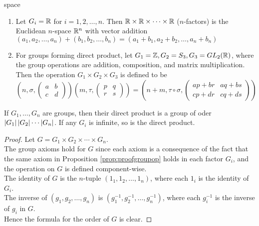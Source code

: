 \begin{example}{\color{white}space}
\begin{enumerate}[label=(\roman*)]
\setlength{\itemsep}{0pt}
\item Let $G_i = \mathbb{R}$ for $i = 1,2,\ldots,n$. Then $\mathbb{R} \times \mathbb{R} \times \cdots \times \mathbb{R}$ ($n$-factors) is the Euclidean $n$-space $\mathbb{R}^n$ with vector addition $(a_1, a_2, \ldots, a_n) + (b_1, b_2, \ldots, b_n) = (a_1 + b_1, a_2 + b_2, \ldots, a_n + b_n)$
\item For groups forming direct product, let $G_1 = \mathbb{Z}, G_2 = S_3, G_3 = GL_2(\mathbb{R})$, where the group operations are addition, composition, and matrix multiplication. Then the operation $G_1 \times G_2 \times G_3$ is defined to be
\begin{equation}
(n,\sigma, \begin{pmatrix}
a & b \\
c & d
\end{pmatrix})
(m,\tau, \begin{pmatrix}
p & q \\
r & s
\end{pmatrix}) =
(n+m,\tau \circ \sigma, \begin{pmatrix}
ap+br & aq+bs \\
cp+dr & cq+ds
\end{pmatrix}) \nonumber
\end{equation}
\end{enumerate}
\end{example}

\begin{proposition}
If $G_1, \ldots, G_n$ are groups, then their direct product is a group of oder $\left\lvert G_1\right\rvert \left\lvert G_2\right\rvert \cdots \left\lvert G_n\right\rvert$. If any $G_i$ is infinite, so is the direct product.
\end{proposition}
\begin{proof}
Let $G = G_1 \times G_2 \times \cdots \times G_n$.\\
The group axioms hold for $G$ since each axiom is a consequence of the fact that the same axiom in Proposition \ref{prop:proofgroupop} holds in each factor $G_i$, and the operation on $G$ is defined component-wise. \\
The identity of $G$ is the $n$-tuple $(1_1, 1_2, \ldots, 1_n)$, where each $1_i$ is the identity of $G_i$.\\
The inverse of $(g_1, g_2, \ldots, g_n)$ is $(g_1^{-1}, g_2^{-1}, \ldots, g_n^{-1})$, where each $g_i^{-1}$ is the inverse of $g_i$ in $G$.\\
Hence the formula for the order of $G$ is clear.
\end{proof}

